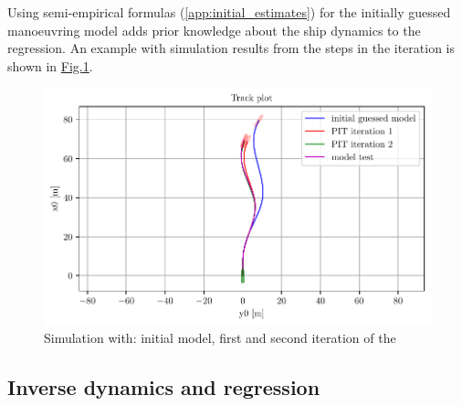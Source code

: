 \noindent Using semi-empirical formulas (\autoref{app:initial_estimates}) for the initially guessed manoeuvring model adds prior knowledge about the ship dynamics to the regression. An example with simulation results from the steps in the iteration is shown in \hyperref[\detokenize{01.01_method:iterations}]{Fig.\@\ref{\detokenize{01.01_method:iterations}}}.


\begin{figure}[H]
    \centering
    \includegraphics[width=\textwidth]{kappa/images/0.pdf}
    \caption{Simulation with: initial model, first and second iteration of the }
    \label{\detokenize{01.01_method:iterations}}
\end{figure}

\subsection{Inverse dynamics and regression}
\label{\detokenize{03.01_inverse_dynamics:inverse-dynamics-and-regression}}\label{\detokenize{03.01_inverse_dynamics::doc}}

